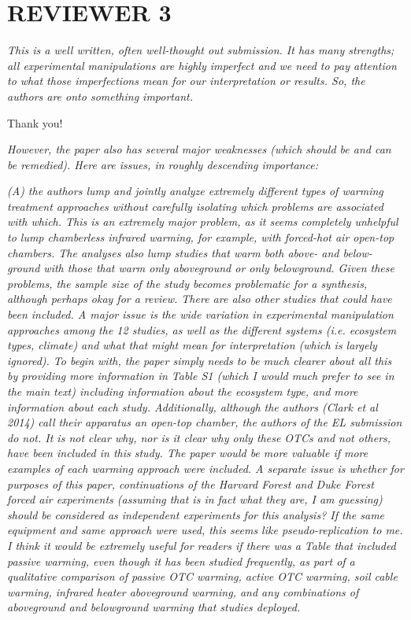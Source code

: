\documentclass[11pt,a4paper]{letter}
\begin{document}
\begin{letter}{}
\section {REVIEWER 3}

\emph{This is a well written, often well-thought out submission. It has many strengths; all experimental manipulations are highly imperfect and we need to pay attention to what those imperfections mean for our interpretation or results. So, the authors are onto something important.}

\par Thank you!

\par \emph{However, the paper also has several major weaknesses (which should be and can be remedied). Here are issues, in roughly descending importance:}

\par \emph{(A) the authors lump and jointly analyze extremely different types of warming treatment approaches without carefully isolating which problems are associated with which. This is an extremely major problem, as it seems completely unhelpful to lump chamberless infrared warming, for example, with forced-hot air open-top chambers. The analyses also lump studies that warm both above- and below-ground with those that warm only aboveground or only belowground. Given these problems, the sample size of the study becomes problematic for a synthesis, although perhaps okay for a review. There are also other studies that could have been included. A major issue is the wide variation in experimental manipulation approaches among the 12 studies, as well as the different systems (i.e. ecosystem types, climate) and what that might mean for interpretation (which is largely ignored). To begin with, the paper simply needs to be much clearer about all this by providing more information in Table S1 (which I would much prefer to see in the main text) including information about the ecosystem type, and more information about each study. Additionally, although the authors (Clark et al 2014) call their apparatus an open-top chamber, the authors of the EL submission do not. It is not clear why, nor is it clear why only these OTCs and not others, have been included in this study. The paper would be more valuable if more examples of each warming approach were included. A separate issue is whether for purposes of this paper, continuations of the Harvard Forest and Duke Forest forced air experiments (assuming that is in fact what they are, I am guessing) should be considered as independent experiments for this analysis? If the same equipment and same approach were used, this seems like pseudo-replication to me. I think it would be extremely useful for readers if there was a Table that included passive warming, even though it has been studied frequently, as part of a qualitative comparison of passive OTC warming, active OTC warming, soil cable warming, infrared heater aboveground warming, and any combinations of aboveground and belowground warming that studies deployed.}


\end{letter}
\end{document}
